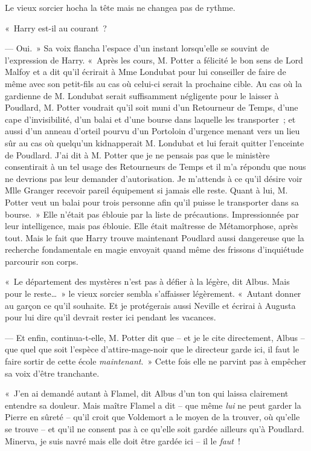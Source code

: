 Le vieux sorcier hocha la tête mais ne changea pas de rythme.

«~Harry est-il au courant~?

--- Oui.~» Sa voix flancha l'espace d'un instant lorsqu'elle se souvint de l'expression de Harry. «~Après les cours, M. Potter a félicité le bon sens de Lord Malfoy et a dit qu'il écrirait à Mme Londubat pour lui conseiller de faire de même avec son petit-fils au cas où celui-ci serait la prochaine cible. Au cas où la gardienne de M. Londubat serait suffisamment négligente pour le laisser à Poudlard, M. Potter voudrait qu'il soit muni d'un Retourneur de Temps, d'une cape d'invisibilité, d'un balai et d'une bourse dans laquelle les transporter~; et aussi d'un anneau d'orteil pourvu d'un Portoloin d'urgence menant vers un lieu sûr au cas où quelqu'un kidnapperait M. Londubat et lui ferait quitter l'enceinte de Poudlard. J'ai dit à M. Potter que je ne pensais pas que le ministère consentirait à un tel usage des Retourneurs de Temps et il m'a répondu que nous ne devrions pas leur demander d'autorisation. Je m'attends à ce qu'il désire voir Mlle Granger recevoir pareil équipement si jamais elle reste. Quant à lui, M. Potter veut un balai pour trois personne afin qu'il puisse le transporter dans sa bourse.~» Elle n'était pas éblouie par la liste de précautions. Impressionnée par leur intelligence, mais pas éblouie. Elle était maîtresse de Métamorphose, après tout. Mais le fait que Harry trouve maintenant Poudlard aussi dangereuse que la recherche fondamentale en magie envoyait quand même des frissons d'inquiétude parcourir son corps.

«~Le département des mystères n'est pas à défier à la légère, dit Albus. Mais pour le reste…~» le vieux sorcier sembla s'affaisser légèrement. «~Autant donner au garçon ce qu'il souhaite. Et je protégerais aussi Neville et écrirai à Augusta pour lui dire qu'il devrait rester ici pendant les vacances.

--- Et enfin, continua-t-elle, M. Potter dit que -- et je le cite directement, Albus -- que quel que soit l'espèce d'attire-mage-noir que le directeur garde ici, il faut le faire sortir de cette école \emph{maintenant}.~» Cette fois elle ne parvint pas à empêcher sa voix d'être tranchante.

«~J'en ai demandé autant à Flamel, dit Albus d'un ton qui laissa clairement entendre sa douleur. Mais maître Flamel a dit -- que même \emph{lui} ne peut garder la Pierre en sûreté -- qu'il croit que Voldemort a le moyen de la trouver, où qu'elle se trouve -- et qu'il ne consent pas à ce qu'elle soit gardée ailleurs qu'à Poudlard. Minerva, je suis navré mais elle doit être gardée ici -- il le \emph{faut}~!


